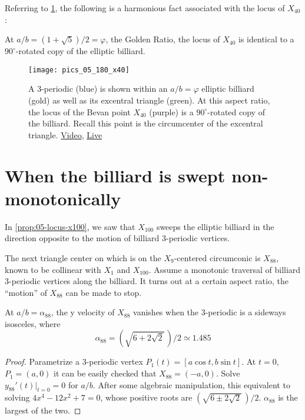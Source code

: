 Referring to \cref{fig:05-x40-golden}, the following is a harmonious fact associated with the locus of $X_{40}$:

\begin{corollary}
At $a/b = (1+\sqrt{5})/2=\varphi$, the Golden Ratio, the locus of $X_{40}$ is identical to a $90^\circ$-rotated copy of the elliptic billiard.
\label{cor:05-x40-golden}
\end{corollary}

\begin{figure}
    \centering
    \texttt{[image: pics\_05\_180\_x40]}
    \caption{A 3-periodic (blue) is shown within an $a/b=\varphi$ elliptic billiard (gold) as well as its excentral triangle (green). At this aspect ratio, the locus of the Bevan point $X_{40}$ (purple) is a $90^\circ$-rotated copy of the billiard. Recall this point is the circumcenter of the excentral triangle. \href{https://youtu.be/rg28gGr-Qeo}{Video}, \href{https://bit.ly/3f4eQ6e}{Live}}
    \label{fig:05-x40-golden}
\end{figure}


\section{When the billiard is swept non-monotonically}

In \cref{prop:05-locus-x100}, we saw that $X_{100}$ sweeps the elliptic billiard in the direction opposite to the motion of billiard 3-periodic vertices.

The next triangle center on \cite{etc} which is on the $X_9$-centered circumconic is $X_{88}$, known to be collinear with $X_1$ and $X_{100}$. Assume a monotonic traversal of billiard 3-periodic vertices along the billiard. It turns out at a certain aspect ratio, the ``motion'' of $X_{88}$ can be made to stop. 

\begin{proposition}
At $a/b=\alpha_{88}$, the y velocity of $X_{88}$ vanishes when the 3-periodic is a sideways isosceles, where 
\[\alpha_{88}=(\sqrt{6+2\sqrt{2}}\,)/2\simeq{1.485} \]
\end{proposition}

\begin{proof}
Parametrize a 3-periodic vertex $P_1(t)=[a \cos{t},b \sin{t}]$. At $t=0$, $P_1=(a,0)$ it can be easily checked that $X_{88}=(-a,0)$. Solve $y_{88}'(t)|_{t=0}=0$ for $a/b$. After some algebraic manipulation, this equivalent to solving $4x^4-12x^2+7=0$, whose positive roots are $(\sqrt{6\pm 2\sqrt{2}}\,)/2$. $\alpha_{88} $ is the largest of the two.
\end{proof}

